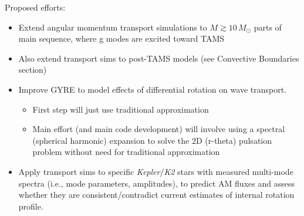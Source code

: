 { Proposed efforts:
 \begin{itemize}
 \item Extend angular momentum transport simulations to $M \gtrsim 10\,M_{\odot}$ parts of main sequence, where g modes are excited toward TAMS
 \item Also extend transport sims to post-TAMS models (see Convective Boundaries section)
 \item Improve GYRE to model effects of differential rotation on wave transport.
 \begin{itemize}
 \item First step will just use traditional approximation
 \item Main effort (and main code development) will involve using a spectral (spherical harmonic) expansion to solve the 2D (r-theta) pulsation problem without need for traditional approximation
 \end{itemize}
 \item Apply transport sims to specific \emph{Kepler}/\emph{K2} stars with measured multi-mode spectra (i.e., mode parameters, amplitudes), to predict AM fluxes and assess whether they are consistent/contradict current estimates of internal rotation profile.
 \end{itemize}


    
}




